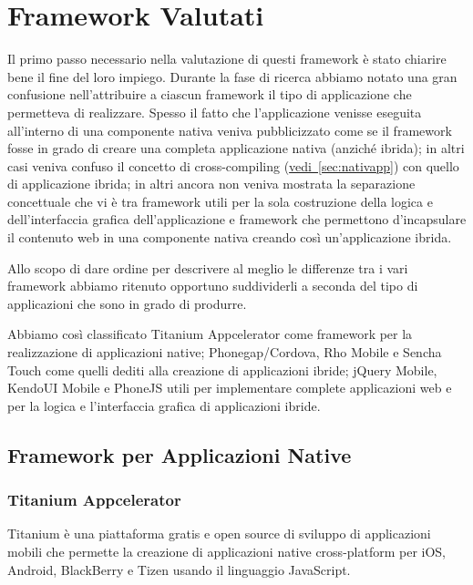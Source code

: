 \chapter{Framework Valutati}
	Il primo passo necessario nella valutazione di questi framework è stato 
	chiarire bene il fine del loro impiego. Durante la fase di ricerca abbiamo 
	notato una gran confusione nell'attribuire a ciascun framework il tipo di
	applicazione che permetteva di realizzare. Spesso il fatto che 
	l'applicazione venisse eseguita all'interno di una componente nativa veniva 
	pubblicizzato come se il framework fosse in grado di creare una completa 
	applicazione nativa (anziché ibrida); in altri casi 
	veniva confuso il concetto di 
	cross-compiling (\hyperref[sec:nativapp]{vedi~\ref{sec:nativapp}}) con
	quello di applicazione ibrida; in altri ancora non veniva mostrata la
	separazione concettuale che vi è tra framework utili per la sola costruzione
	della logica e dell'interfaccia grafica dell'applicazione e framework che 
	permettono d'incapsulare il contenuto web in una componente nativa creando 
	così un'applicazione ibrida.
	
	Allo scopo di dare ordine per descrivere al meglio le differenze tra i vari 
	framework abbiamo ritenuto opportuno suddividerli a seconda del tipo di 
	applicazioni che sono in grado di produrre.
	
	Abbiamo così classificato Titanium Appcelerator come framework per la 
	realizzazione di applicazioni native; Phonegap/Cordova, Rho Mobile e Sencha 
	Touch come quelli dediti alla creazione di applicazioni ibride; jQuery 
	Mobile, KendoUI Mobile e PhoneJS utili per implementare complete 
	applicazioni web e per la logica e l'interfaccia grafica di applicazioni 
	ibride.

	\section{Framework per Applicazioni Native}
		
		\subsection{Titanium Appcelerator}
		\label{sec:titanium}
			Titanium è una piattaforma gratis e open source di sviluppo di 
			applicazioni mobili che permette la creazione di applicazioni native
			cross-platform per iOS, Android, BlackBerry e Tizen usando il 
			linguaggio JavaScript.
			
